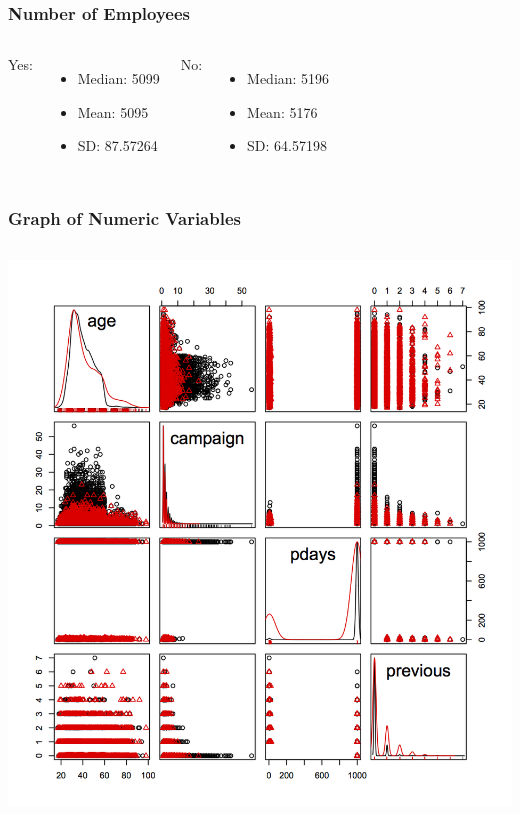 \documentclass{beamer}
\begin{document}
\begin{frame}
	\frametitle{Number of Employees}
	\begin{columns}[c] %
		
    Yes:
		\begin{itemize}
			\item Median: 5099
			\item Mean: 5095
      \item SD: 87.57264
		\end{itemize}
		
    No:
		\begin{itemize}
			\item Median: 5196
			\item Mean: 5176
      \item SD: 64.57198
		\end{itemize}
		
	\end{columns}
\end{frame}

\begin{frame}
  \frametitle{Graph of Numeric Variables}
	\begin{columns}[c] %
		\column{.65\textwidth}
    \includegraphics[height=\textheight]{matrix1}
  \end{columns}
\end{frame}
\end{document}

